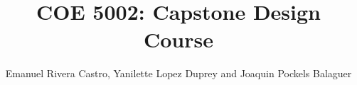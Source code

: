 \documentclass[12pt]{report}
\title{COE 5002: Capstone Design Course}
\author{Emanuel Rivera Castro, Yanilette Lopez Duprey and Joaquin Pockels Balaguer}
\begin{document}
\maketitle
\pagebreak
\tableofcontents
\listoftables
\listoffigures

\end{document}
